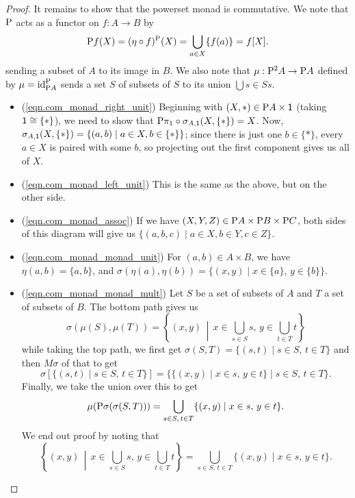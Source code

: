 \documentclass[DynamicalBook]{subfiles}
\begin{document}
\begin{proof}
It remains to show that the powerset monad is commutative. We note that
$\mathrm{P}$ acts as a functor on $f : A \to B$ by 
\[
\mathrm{P} f (X) = (\eta \circ
f)^{\mathrm{P}}(X) = \bigcup_{a \in X}\{f(a)\} = f[X].
\]
sending a subset of $A$ to its image in $B$. We also note that $\mu : \mathrm{P}^2
A \to \mathrm{P} A$ defined by $\mu = \mathrm{id}_{\mathrm{P} A}^{\mathrm{P}}$ sends a set $S$
of subsets of $S$ to its union $\bigcup{s \in S} s$.
\begin{itemize}
  \item (\cref{eqn.com_monad_right_unit}) Beginning with $(X, \ast) \in \mathrm{P}
    A \times \mathsf{1}$ (taking $\mathsf{1} \cong \{\ast\}$), we need to
    show that $\mathrm{P} \pi_1 \circ \sigma_{A, \mathsf{1}}(X, \{\ast\}) = X$. Now,
    $\sigma_{A, \mathsf{1}}(X, \{\ast\}) = \{(a, b) \mid a \in X, b \in \{\ast\}\}$; since
    there is just one $b \in \{\ast\}$, every $a \in X$ is paired with
    some $b$, so projecting out the first component gives us all of $X$.
    \item (\cref{eqn.com_monad_left_unit}) This is the same as the above, but on the other side.
    \item (\cref{eqn.com_monad_assoc}) If we have $(X, Y, Z) \in \mathrm{P} A \times \mathrm{P} B \times \mathrm{P}
      C$, both sides of this diagram will give us $\{(a, b, c) \mid a \in X, b
      \in Y, c \in Z\}$. 
    \item (\cref{eqn.com_monad_monad_unit}) For $(a, b) \in A \times B$, we have
      $\eta(a, b) = \{a, b\}$, and $\sigma(\eta(a), \eta(b)) = \{(x, y) \mid x
      \in \{a\},\, y \in \{b\}\}$.
   \item (\cref{eqn.com_monad_monad_mult}) Let $S$ be a set of subsets of $A$
     and $T$ a set of subsets of $B$. The bottom path gives us
     \[
\sigma(\mu(S), \mu(T)) = \left\{(x, y) \,\middle|\, x \in \bigcup_{s \in S} s,\, y \in \bigcup_{t \in T} t\right\}
\]
while taking the top path, we first get $\sigma(S, T) = \{(s, t) \mid s \in S,\,
t \in T\}$ and then $M\sigma$ of that to get
\[
\sigma\left[ \{(s, t) \mid s \in S,\, t \in T\} \right] = \{\{(x, y) \mid x \in
s,\, y \in t\} \mid s \in S,\, t \in T\}.
\]
Finally, we take the union over this to get
\[
\mu(\mathrm{P} \sigma(\sigma(S, T))) = \bigcup_{s \in S,\, t \in T}\{(x, y) \mid x \in s,\, y \in t\}.
\]
        We end out proof by noting that
        \[
        \left\{(x, y) \,\middle|\, x \in \bigcup_{s \in S} s,\, y \in \bigcup_{t \in T} t\right\}
        =\bigcup_{s \in S,\, t \in T}\{(x, y) \mid x \in s,\, y \in t\}.
        \]
\end{itemize}
\end{proof}
\end{document}
